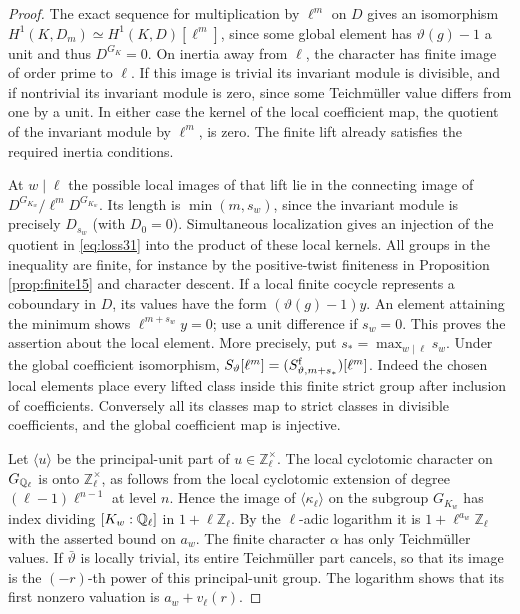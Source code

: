 \documentclass[a4paper,11pt]{article}
\theoremstyle{definition}
\theoremstyle{remark}
\newcommand{\ZZ}{\mathbb Z}\newcommand{\ord}{\operatorname{ord}}
\numberwithin{equation}{section}
\begin{document}
\begin{proof}
The exact sequence for multiplication by \(\ell^m\) on \(D\) gives an isomorphism \(H^1(K,D_m)\simeq H^1(K,D)[\ell^m]\), since some global element has \(\vartheta(g)-1\) a unit and thus \(D^{G_K}=0\). On inertia away from \(\ell\), the character has finite image of order prime to \(\ell\). If this image is trivial its invariant module is divisible, and if nontrivial its invariant module is zero, since some Teichm\"uller value differs from one by a unit. In either case the kernel of the local coefficient map, the quotient of the invariant module by \(\ell^m\), is zero. The finite lift already satisfies the required inertia conditions.

At \(w\mid\ell\) the possible local images of that lift lie in the connecting image of \(D^{G_{K_w}}/\ell^mD^{G_{K_w}}\). Its length is \(\min(m,s_w)\), since the invariant module is precisely \(D_{s_w}\) (with \(D_0=0\)). Simultaneous localization gives an injection of the quotient in \eqref{eq:loss31} into the product of these local kernels. All groups in the inequality are finite, for instance by the positive-twist finiteness in Proposition \ref{prop:finite15} and character descent. If a local finite cocycle represents a coboundary in \(D\), its values have the form \((\vartheta(g)-1)y\). An element attaining the minimum shows \(\ell^{m+s_w}y=0\); use a unit difference if \(s_w=0\). This proves the assertion about the local element. More precisely, put \(s_* = \max_{w\mid\ell}s_w\). Under the global coefficient isomorphism, \(S_\vartheta[\ell^m]=(S_{\vartheta,m+s_*}^{\rm f})[\ell^m]\). Indeed the chosen local elements place every lifted class inside this finite strict group after inclusion of coefficients. Conversely all its classes map to strict classes in divisible coefficients, and the global coefficient map is injective.

Let \(\langle u\rangle\) be the principal-unit part of \(u\in\ZZ_\ell^\times\). The local cyclotomic character on \(G_{\mathbb Q_\ell}\) is onto \(\ZZ_\ell^\times\), as follows from the local cyclotomic extension of degree \((\ell-1)\ell^{n-1}\) at level \(n\). Hence the image of \(\langle\kappa_\ell\rangle\) on the subgroup \(G_{K_w}\) has index dividing \([K_w:\mathbb Q_\ell]\) in \(1+\ell\ZZ_\ell\). By the \(\ell\)-adic logarithm it is \(1+\ell^{a_w}\ZZ_\ell\) with the asserted bound on \(a_w\). The finite character \(\alpha\) has only Teichm\"uller values. If \(\bar\vartheta\) is locally trivial, its entire Teichm\"uller part cancels, so that its image is the \((-r)\)-th power of this principal-unit group. The logarithm shows that its first nonzero valuation is \(a_w+v_\ell(r)\).
\end{proof}
\end{document}
